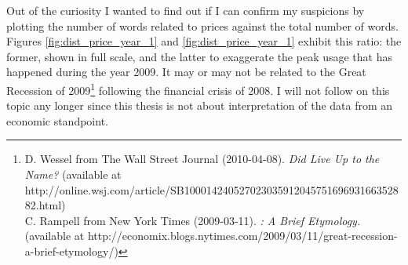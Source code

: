     Out of the curiosity I wanted to find out if I can confirm my suspicions by plotting the number of words related to prices against the total number of words. Figures \ref{fig:dist_price_year_1} and \ref{fig:dist_price_year_1} exhibit this ratio: the former, shown in full scale, and the latter  to exaggerate the peak usage that has happened during the year 2009. It may or may not be related to the Great Recession of 2009\footnote{D. Wessel from The Wall Street Journal (2010-04-08). \emph{Did  Live Up to the Name?} (available at http://online.wsj.com/article/SB10001424052702303591204575169693166352882.html) \\ C. Rampell from New York Times (2009-03-11). \emph{: A Brief Etymology.} (available at http://economix.blogs.nytimes.com/2009/03/11/great-recession-a-brief-etymology/)} following the financial crisis of 2008. I will not follow on this topic any longer since this thesis is not about interpretation of the data from an economic standpoint.
    
